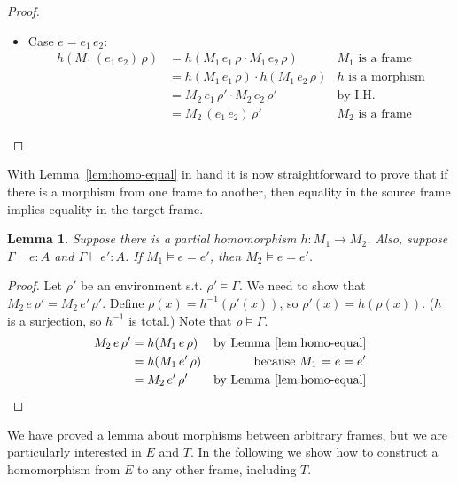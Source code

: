 \documentclass{tufte-handout}
\newcommand{\APP}[0]{\,}
\newtheorem{lemma}[theorem]{Lemma}
\begin{document}
\begin{proof}
\begin{itemize}
  \item Case $e=e_1 \APP e_2$:\\
    \begin{align*}
    h(M_1\,(e_1 \APP e_2)\,\rho) 
    &= h(M_1\,e_1\,\rho \cdot M_1\,e_2\,\rho) & \text{$M_1$ is a frame} \\
    &= h(M_1\,e_1\,\rho) \cdot h(M_1\,e_2\,\rho) & \text{$h$ is a morphism}\\
    &= M_2\,e_1\,\rho' \cdot M_2\,e_2\,\rho' & \text{by I.H.}\\
    &= M_2\,(e_1 \APP e_2)\,\rho' & \text{$M_2$ is a frame}
    \end{align*}

  \end{itemize}
\end{proof}


With Lemma~\ref{lem:homo-equal} in hand it is now straightforward to
prove that if there is a morphism from one frame to another, then
equality in the source frame implies equality in the target frame.

\begin{lemma}
\label{lem:homo-models}
Suppose there is a partial homomorphism $h : M_1 \to M_2$.
Also, suppose $\Gamma \vdash e : A$ and $\Gamma \vdash e' : A$.
If $M_1 \models e = e'$, then $M_2 \models e = e'$.
\end{lemma}
\begin{proof}
  Let $\rho'$ be an environment s.t. $\rho' \models \Gamma$.  We need
  to show that $M_2\,e\,\rho' = M_2\,e'\,\rho'$.  Define $\rho(x) =
  h^{-1}(\rho'(x))$, so $\rho'(x) = h(\rho(x))$.  ($h$ is a
  surjection, so $h^{-1}$ is total.) Note that $\rho \models \Gamma$.
  \begin{align*}
    M_2\,e\,\rho' 
    &= h(M_1\,e\,\rho) & \text{by Lemma~\ref{lem:homo-equal}}\\
    &= h(M_1\,e'\,\rho) & \text{because } M_1 \models e = e'\\
    &= M_2\,e'\,\rho' & \text{by Lemma~\ref{lem:homo-equal}}
  \end{align*}
\end{proof}


We have proved a lemma about morphisms between arbitrary frames, but
we are particularly interested in $E$ and $T$. In the following we
show how to construct a homomorphism from $E$ to any other frame,
including $T$.
\end{document}
